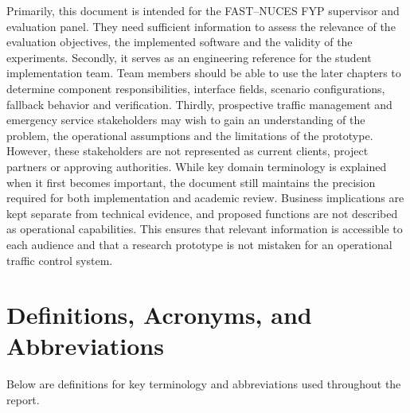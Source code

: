 Primarily, this document is intended for the FAST--NUCES FYP supervisor and evaluation panel. They need sufficient information to assess the relevance of the evaluation objectives, the implemented software and the validity of the experiments. Secondly, it serves as an engineering reference for the student implementation team. Team members should be able to use the later chapters to determine component responsibilities, interface fields, scenario configurations, fallback behavior and verification. Thirdly, prospective traffic management and emergency service stakeholders may wish to gain an understanding of the problem, the operational assumptions and the limitations of the prototype. However, these stakeholders are not represented as current clients, project partners or approving authorities. While key domain terminology is explained when it first becomes important, the document still maintains the precision required for both implementation and academic review. Business implications are kept separate from technical evidence, and proposed functions are not described as operational capabilities. This ensures that relevant information is accessible to each audience and that a research prototype is not mistaken for an operational traffic control system.

\section{Definitions, Acronyms, and Abbreviations}

Below are definitions for key terminology and abbreviations used throughout the report.

